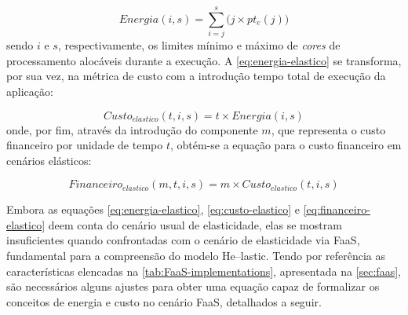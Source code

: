 \documentclass[english,brazilian]{UNISINOSmonografia} %
\begin{document}
\begin{equation}
\label{eq:energia-elastico}
Energia(i,s) = \sum_{i=j}^{s} \big( j \times pt_e(j) \big) 
\end{equation}
sendo $ i $ e $ s $, respectivamente, os limites mínimo e máximo de \textit{cores} de processamento alocáveis durante a execução.
A \autoref{eq:energia-elastico} se transforma, por sua vez, na métrica de custo com a introdução tempo total de execução da aplicação:

\begin{equation}
\label{eq:custo-elastico}
Custo_{elastico}(t,i,s) = t \times Energia(i,s)
\end{equation}
onde, por fim, através da introdução do componente $ m $, que representa o custo financeiro por unidade de tempo $ t $, obtém-se a equação para o custo financeiro em cenários elásticos:

\begin{equation}
\label{eq:financeiro-elastico}
Financeiro_{elastico}(m,t,i,s) = m \times Custo_{elastico}(t,i,s)
\end{equation}



Embora as equações \ref{eq:energia-elastico}, \ref{eq:custo-elastico} e \ref{eq:financeiro-elastico} deem conta do cenário usual de elasticidade, elas se mostram insuficientes quando confrontadas com o cenário de elasticidade via FaaS, fundamental para a compreensão do modelo \textsf{He}--lastic.
Tendo por referência as características elencadas na \autoref{tab:FaaS-implementations}, apresentada na \autoref{sec:faas}, são necessários alguns ajustes para obter uma equação capaz de formalizar os conceitos de energia e custo no cenário FaaS, detalhados a seguir.
\end{document}
